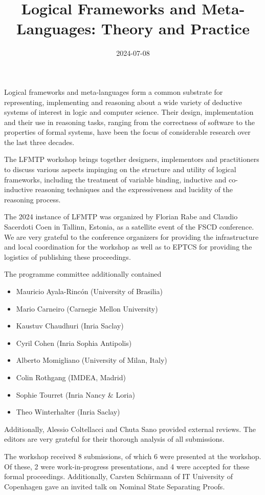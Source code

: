 \documentclass{article}
\begin{document}
\title{Logical Frameworks and Meta-Languages: Theory and Practice}
\date{2024-07-08}
\maketitle

Logical frameworks and meta-languages form a common substrate for
representing, implementing and reasoning about a wide variety of
deductive systems of interest in logic and computer science. Their
design, implementation and their use in reasoning tasks, ranging from
the correctness of software to the properties of formal systems,
have been the focus of considerable research over the last three decades.

The LFMTP workshop brings together designers, implementors and
practitioners to discuss various aspects impinging on the structure and
utility of logical frameworks, including the treatment of variable
binding, inductive and co-inductive reasoning techniques and the
expressiveness and lucidity of the reasoning process.

The 2024 instance of LFMTP was organized by Florian Rabe and Claudio Sacerdoti Coen in Tallinn, Estonia, as a satellite event of the FSCD conference.
	We are very grateful to the conference organizers for providing the infrastructure and local coordination for the workshop as well as to EPTCS for providing the logistics of publishing these proceedings.

The programme committee additionally contained
\begin{itemize}
\item Mauricio Ayala-Rincón (University of Brasilia)
\item Mario Carneiro (Carnegie Mellon University)
\item Kaustuv Chaudhuri (Inria Saclay)
\item Cyril Cohen (Inria Sophia Antipolis)
\item Alberto Momigliano (University of Milan, Italy)
\item Colin Rothgang (IMDEA, Madrid)
\item Sophie Tourret (Inria Nancy \& Loria)
\item Theo Winterhalter (Inria Saclay)
\end{itemize}
Additionally, Alessio Coltellacci and Chuta Sano provided external reviews.
The editors are very grateful for their thorough analysis of all submissions.

The workshop received 8 submissions, of which 6 were presented at the workshop.
Of these, 2 were work-in-progress presentations, and 4 were accepted for these formal proceedings.
Additionally, Carsten Sch\"urmann of IT University of Copenhagen gave an invited talk on Nominal State Separating Proofs.
\end{document}
